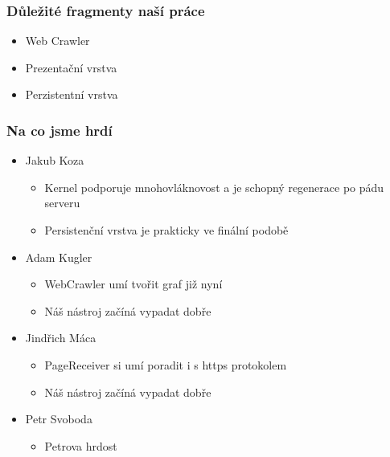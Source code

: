 \documentclass{beamer}
\begin{document}
\begin{frame}[allowframebreaks]\frametitle{Důležité fragmenty naší práce}
  \begin{itemize}
    \item Web Crawler
		\item Prezentační vrstva
		\item Perzistentní vrstva
  \end{itemize}
\end{frame}

\begin{frame}[allowframebreaks]\frametitle{Na co jsme hrdí} 
  \begin{itemize}
    \item Jakub Koza
      \begin{itemize}
				\item Kernel podporuje mnohovláknovost a je schopný regenerace po pádu serveru
				\item Persistenční vrstva je prakticky ve finální podobě
     \end{itemize}
   
    \item Adam Kugler
      \begin{itemize}
				\item WebCrawler umí tvořit graf již nyní
				\item Náš nástroj začíná vypadat dobře
     \end{itemize}

    \item Jindřich Máca
      \begin{itemize}
        \item PageReceiver si umí poradit i s https protokolem
				\item Náš nástroj začíná vypadat dobře
      \end{itemize}  
   
    \item Petr Svoboda
      \begin{itemize}
				\item Petrova hrdost
     \end{itemize}
   \end{itemize}  
\end{frame}
\end{document}
